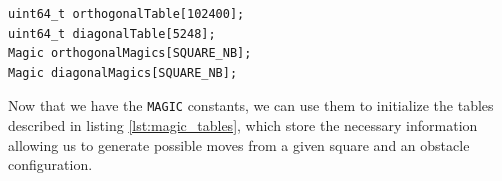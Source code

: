 \documentclass[12pt,a4paper,twoside,openright]{book}
\begin{document}
\begin{mdframed}[skipabove=\baselineskip,hidealllines=true]
\begin{verbatim}
uint64_t orthogonalTable[102400];
uint64_t diagonalTable[5248];
Magic orthogonalMagics[SQUARE_NB];
Magic diagonalMagics[SQUARE_NB];
\end{verbatim}
\label{lst:magic_tables}
\end{mdframed}

Now that we have the \texttt{MAGIC} constants, we can use them to initialize the tables described in listing \ref{lst:magic_tables}, which store the necessary information allowing us to generate possible moves from a given square and an obstacle configuration.
\end{document}
